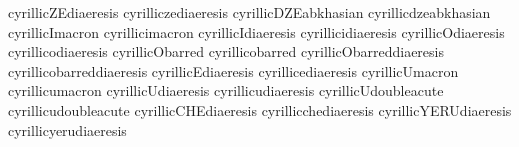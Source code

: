  cyrillicZEdiaeresis        {}
 cyrilliczediaeresis        {}
 cyrillicDZEabkhasian       {}
 cyrillicdzeabkhasian       {}
 cyrillicImacron            {}
 cyrillicimacron            {}
 cyrillicIdiaeresis         {}
 cyrillicidiaeresis         {}
 cyrillicOdiaeresis         {}
 cyrillicodiaeresis         {}
 cyrillicObarred            {}
 cyrillicobarred            {}
 cyrillicObarreddiaeresis   {}
 cyrillicobarreddiaeresis   {}
 cyrillicEdiaeresis         {}
 cyrillicediaeresis         {}
 cyrillicUmacron            {}
 cyrillicumacron            {}
 cyrillicUdiaeresis         {}
 cyrillicudiaeresis         {}
 cyrillicUdoubleacute       {}
 cyrillicudoubleacute       {}
 cyrillicCHEdiaeresis       {}
 cyrillicchediaeresis       {}
 cyrillicYERUdiaeresis      {}
 cyrillicyerudiaeresis      {}

\stopencoding


\startencoding[uc]

